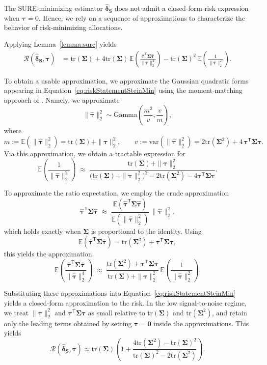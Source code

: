 \documentclass{article}
\newcommand{\bsSigma}{\boldsymbol \Sigma}
\newcommand{\bstau}{\boldsymbol \tau}
\newcommand{\hbstau}{\boldsymbol{\hat \tau}}
\newcommand{\bsSig}{\boldsymbol  \Sigma}
\def\e{\mathbb{E}}
\def\var{\text{var}}
\newcommand{\Tr}{\text{tr}}
\newcommand{\bsdelts}{\boldsymbol {\hat \delta_S}}
\newcommand{\tran}{\mathsf{T}}
\begin{document}
The SURE-minimizing estimator $\bsdelts$ does not admit a closed-form risk expression when $\bstau = 0$. Hence, we rely on a sequence of approximations to characterize the behavior of risk-minimizing allocations.

Applying Lemma~\ref{lemma:sure} yields
\begin{equation}\label{eq:riskStatementSteinMin}
\begin{aligned}
\mathcal{R}\left( \bsdelts, \bstau \right)
&=
\Tr(\bsSigma)
+
4 \Tr(\bsSig)\,
\e \left( \frac{\hbstau^\tran \bsSig \hbstau}{\|\hbstau\|_2^4} \right)
-
\Tr(\bsSig)^2\,
\e \left( \frac{1}{\|\hbstau\|_2^2} \right).
\end{aligned}
\end{equation}

To obtain a usable approximation, we approximate the Gaussian quadratic forms
appearing in Equation~\eqref{eq:riskStatementSteinMin} using the moment-matching
approach of \cite{satterthwaite1946approximate}. Namely, we approximate
\[
\|\hbstau\|_2^2 \sim \text{Gamma}\!\left( \frac{m^2}{v}, \frac{v}{m} \right),
\]
where
\[
m := \e\!\left( \|\hbstau\|_2^2 \right)
= \Tr(\bsSig) + \|\bstau\|_2^2,
\qquad
v := \var\!\left( \|\hbstau\|_2^2 \right)
= 2\Tr(\bsSig^2) + 4\,\bstau^\tran \bsSig \bstau .
\]
Via this approximation, we obtain a tractable expression for
\[
\e \left( \frac{1}{\|\hbstau\|_2^2} \right)
\;\approx\;
\frac{\Tr(\bsSig) + \|\bstau\|_2^2}
{\big(\Tr(\bsSig) + \|\bstau\|_2^2\big)^2
- 2\Tr(\bsSig^2) - 4\bstau^\tran \bsSig \bstau}.
\]

To approximate the ratio expectation, we employ the crude
approximation
\[
\hbstau^\tran \bsSig \hbstau
\;\approx\;
\frac{\e\!\left( \hbstau^\tran \bsSig \hbstau \right)}
{\e\!\left( \|\hbstau\|_2^2 \right)}\,
\|\hbstau\|_2^2,
\]
which holds exactly when $\bsSig$ is proportional to the identity. Using
\[
\e\!\left( \hbstau^\tran \bsSig \hbstau \right)
= \Tr(\bsSig^2) + \bstau^\tran \bsSig \bstau,
\]
this yields the approximation
\[
\e \left( \frac{\hbstau^\tran \bsSig \hbstau}{\|\hbstau\|_2^4} \right)
\;\approx\;
\frac{\Tr(\bsSig^2) + \bstau^\tran \bsSig \bstau}
{\Tr(\bsSig) + \|\bstau\|_2^2}\,
\e \left( \frac{1}{\|\hbstau\|_2^2} \right).
\]

Substituting these approximations into
Equation~\ref{eq:riskStatementSteinMin} yields a closed-form approximation to the
risk. In the low signal-to-noise regime, we treat $\|\bstau\|_2^2$ and
$\bstau^\tran \bsSig \bstau$ as small relative to $\Tr(\bsSig)$ and
$\Tr(\bsSig^2)$, and retain only the leading terms obtained by setting
$\bstau=\boldsymbol 0$ inside the approximations. This yields
\[ \mathcal R(\bsdelts,\bstau) \approx \Tr(\bsSig) \left( 1 + \frac{4\Tr(\bsSig^2)-\Tr(\bsSig)^2}{\Tr(\bsSig)^2-2\Tr(\bsSig^2)} \right).\]
\end{document}
